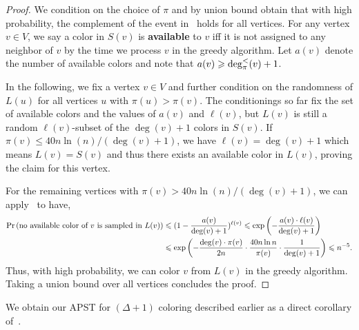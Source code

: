 	\begin{proof}	
		We condition on the choice of $\pi$ and by union bound obtain that with high probability, the complement of the event in~ holds for all vertices. 
		For any vertex $v \in V$, we say a color in $S(v)$ is \textbf{available} to $v$ iff it is not assigned to any neighbor of $v$ by the time we process $v$ in the greedy algorithm. 
		Let $a(v)$ denote the number of available colors and note that $a(v) \geqslant  \deg^{<}_{\pi}(v)+1$. 
		
		In the following, we fix a vertex $v \in V$ and further condition on the randomness of $L(u)$ for all vertices $u$ with $\pi(u) > \pi(v)$. The conditionings so far fix the set of available colors and the values of $a(v)$ and $\ell(v)$, but $L(v)$ is still a random $\ell(v)$-subset of the $\deg(v)+1$ colors in $S(v)$. If $\pi(v) \leq 40n\ln(n)/(\deg(v)+1)$, we have $\ell(v) = \deg(v)+1$ which means $L(v) = S(v)$ and thus there exists an available color in $L(v)$, proving the claim for this vertex. 
		
		For the remaining vertices with $\pi(v) > 40n\ln(n)/(\deg(v)+1)$, we can apply~ to have, 
		\begin{align*}
			\operatorname*{\textnormal{Pr}}\left(\text{no available color of $v$ is sampled in $L(v)$}\right) &\leqslant (1-\frac{a(v)}{\deg(v)+1})^{\ell(v)} \leqslant \exp\left(-\frac{a(v) \cdot \ell(v)}{\deg(v)+1}\right) \\ 
			& \leqslant \exp\left(-\frac{\deg(v) \cdot \pi(v)}{2n} \cdot \frac{40n\ln{n}}{\pi(v)} \cdot \frac{1}{\deg(v)+1}\right) \leqslant n^{-5}.
		\end{align*}
		Thus, with high probability, we can color $v$ from $L(v)$ in the greedy algorithm. Taking a union bound over all vertices concludes the proof. 
	\end{proof}
	

We obtain our  APST for $(\Delta+1)$ coloring described earlier as a direct corollary of~. 

